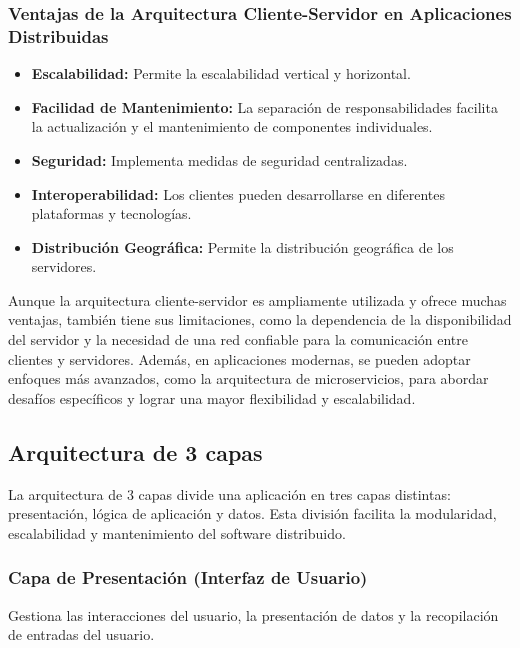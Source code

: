 	\subsubsection{Ventajas de la Arquitectura Cliente-Servidor en Aplicaciones Distribuidas}
	\begin{itemize}
		\item \textbf{Escalabilidad:} Permite la escalabilidad vertical y horizontal.
		\item \textbf{Facilidad de Mantenimiento:} La separación de responsabilidades facilita la actualización y el mantenimiento de componentes individuales.
		\item \textbf{Seguridad:} Implementa medidas de seguridad centralizadas.
		\item \textbf{Interoperabilidad:} Los clientes pueden desarrollarse en diferentes plataformas y tecnologías.
		\item \textbf{Distribución Geográfica:} Permite la distribución geográfica de los servidores.
	\end{itemize}
	
	\begin{tcolorbox}[colback=yellow!10!white, colframe=blue!50!black, title=Concluyendo, coltitle=white]
		Aunque la arquitectura cliente-servidor es ampliamente utilizada y ofrece muchas ventajas, también tiene sus limitaciones, como la dependencia de la disponibilidad del servidor y la necesidad de una red confiable para la comunicación entre clientes y servidores. Además, en aplicaciones modernas, se pueden adoptar enfoques más avanzados, como la arquitectura de microservicios, para abordar desafíos específicos y lograr una mayor flexibilidad y escalabilidad.
	\end{tcolorbox}
	
	\subsection{Arquitectura de 3 capas}
	La arquitectura de 3 capas divide una aplicación en tres capas distintas: presentación, lógica de aplicación y datos. Esta división facilita la modularidad, escalabilidad y mantenimiento del software distribuido.
	
	\subsubsection{Capa de Presentación (Interfaz de Usuario)}
	Gestiona las interacciones del usuario, la presentación de datos y la recopilación de entradas del usuario.
	
